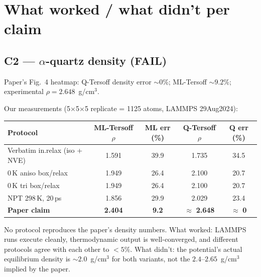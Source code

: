 \documentclass[11pt]{article}
\newcommand{\FAIL}[0]{{\color{red!70!black}\textbf{FAIL}}}
\begin{document}
\section{What worked / what didn't per claim}

\subsection{C2 --- $\alpha$-quartz density (\FAIL)}
Paper's Fig.\ 4 heatmap: Q-Tersoff density error $\sim 0\%$; ML-Tersoff $\sim 9.2\%$; experimental $\rho = 2.648$~g/cm$^3$.

Our measurements (5$\times$5$\times$5 replicate = 1125 atoms, LAMMPS 29Aug2024):
\begin{center}
\begin{tabular}{lcccc}
\toprule
Protocol & ML-Tersoff $\rho$ & ML err (\%) & Q-Tersoff $\rho$ & Q err (\%) \\
\midrule
Verbatim in.relax (iso + NVE) & 1.591 & 39.9 & 1.735 & 34.5 \\
0\,K aniso box/relax          & 1.949 & 26.4 & 2.100 & 20.7 \\
0\,K tri  box/relax           & 1.949 & 26.4 & 2.100 & 20.7 \\
NPT 298\,K, 20\,ps            & 1.856 & 29.9 & 2.029 & 23.4 \\
\midrule
\textbf{Paper claim}          & \textbf{2.404} & \textbf{9.2} & $\approx$ \textbf{2.648} & $\approx$ \textbf{0} \\
\bottomrule
\end{tabular}
\end{center}
No protocol reproduces the paper's density numbers. What worked: LAMMPS runs execute cleanly, thermodynamic output is well-converged, and different protocols agree with each other to $< 5\%$. What didn't: the potential's actual equilibrium density is $\sim 2.0$~g/cm$^3$ for both variants, not the $2.4$--$2.65$~g/cm$^3$ implied by the paper.
\end{document}
